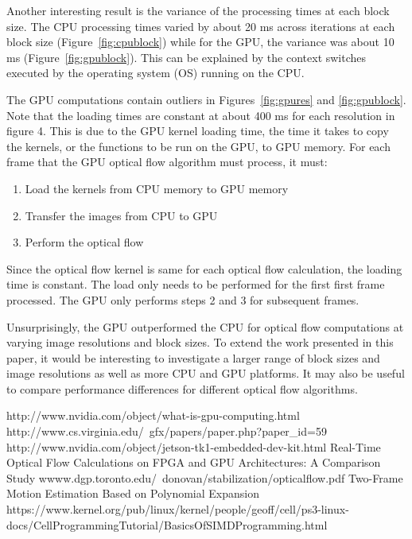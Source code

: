 \documentclass[12pt,letterpaper]{article}
\begin{document}
Another interesting result is the variance of the processing times at each
block size. The CPU processing times varied by about 20 ms across iterations at
each block size (Figure~\ref{fig:cpublock}) while for the GPU, the variance was
about 10 ms (Figure~\ref{fig:gpublock}). This can be explained by the context
switches executed by the operating system (OS) running on the CPU.

The GPU computations contain outliers in Figures~\ref{fig:gpures} and
\ref{fig:gpublock}. Note that the loading times are constant at about 400 ms
for each resolution in figure 4. This is due to the GPU kernel loading time,
the time it takes to copy the kernels, or the functions to be run on the GPU,
to GPU memory. For each frame that the GPU optical flow algorithm must process,
it must:

\begin{enumerate}
  \item Load the kernels from CPU memory to GPU memory
  \item Transfer the images from CPU to GPU
  \item Perform the optical flow
\end{enumerate}

Since the optical flow kernel is same for each optical flow calculation, the
loading time is constant. The load only needs to be performed for the first
first frame processed. The GPU only performs steps 2 and 3 for subsequent
frames.

Unsurprisingly, the GPU outperformed the CPU for optical flow computations at
varying image resolutions and block sizes. To extend the work presented in this
paper, it would be interesting to investigate a larger range of block sizes and
image resolutions as well as more CPU and GPU platforms. It may also be useful
to compare performance differences for different optical flow algorithms.

\begin{thebibliography}{10}
    http://www.nvidia.com/object/what-is-gpu-computing.html
    http://www.cs.virginia.edu/~gfx/papers/paper.php?paper\_id=59
    http://www.nvidia.com/object/jetson-tk1-embedded-dev-kit.html
    Real-Time Optical Flow Calculations on FPGA and GPU Architectures: A Comparison
    Study
    wwww.dgp.toronto.edu/~donovan/stabilization/opticalflow.pdf
    Two-Frame Motion Estimation Based on Polynomial Expansion
    https://www.kernel.org/pub/linux/kernel/people/geoff/cell/ps3-linux-docs/CellProgrammingTutorial/BasicsOfSIMDProgramming.html
\end{thebibliography}
\end{document}
